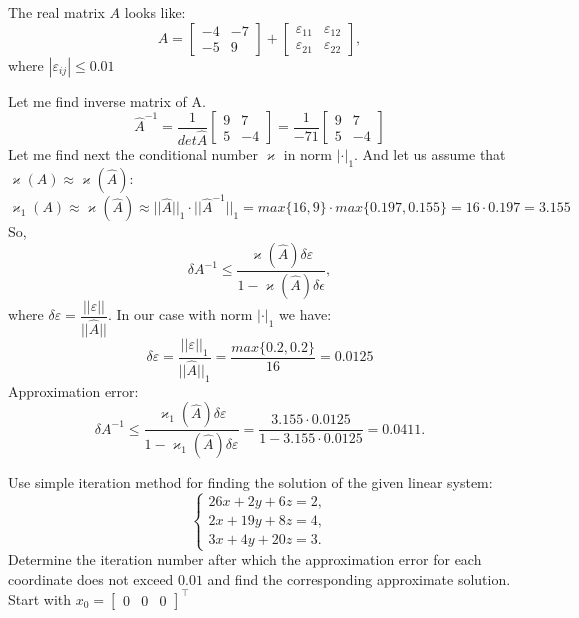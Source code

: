\documentclass[12pt]{report}
\begin{document}
\begin{solution}
    The real matrix $A$ looks like:
    \[A = \begin{bmatrix}-4 & -7\\-5 & 9\end{bmatrix}+\begin{bmatrix}\varepsilon_{11} & \varepsilon_{12}\\\varepsilon_{21} & \varepsilon_{22}\end{bmatrix},\]
   where $|\varepsilon_{ij}|\leq 0.01$

   Let me find  inverse matrix of A.
   \[
      \hat{A}^{-1} = \dfrac{1}{det \hat A}\begin{bmatrix} 9 & 7\\5 & -4\end{bmatrix}=\dfrac{1}{-71}\begin{bmatrix} 9 & 7\\5 & -4\end{bmatrix}
   \]
   Let me find next the conditional number $\varkappa$ in norm $|\cdot|_1$.  
   And let us assume that $\varkappa (A) \approx \varkappa(\hat A)$:
   \[\varkappa_1(A) \approx \varkappa(\hat{A}) \approx ||\hat{A}||_1\cdot||\hat A^{-1}||_1=max\{16,9\}\cdot max\{0.197, 0.155\} = 16 \cdot 0.197 = 3.155\]
   So,
   \[ \delta A^{-1} \leq \dfrac{\varkappa(\hat A) \delta \varepsilon}{1-\varkappa (\hat A)\delta \epsilon},
   \]
   where $\delta \varepsilon = \dfrac {||\varepsilon||}{||\hat A||}$.
   In our case with norm $|\cdot|_1$ we have:  
   \[
      \delta \varepsilon = \dfrac {||\varepsilon||_1}{||\hat A||_1}=\dfrac {max\{0.2,0.2\}}{16}=0.0125
   \]
   Approximation error:
   \[ \delta A^{-1} \leq \dfrac{\varkappa_1(\hat A) \delta \varepsilon}{1-\varkappa_1 (\hat A)\delta \varepsilon}=\dfrac{3.155\cdot 0.0125}{1-3.155\cdot 0.0125}=0.0411.
   \]
\end{solution}

\begin{problem}{}
    Use simple iteration method for finding the solution of the given linear system:
    \[
         \left\{
            \begin{array}{c}
               26x + 2y + 6z = 2,\\
               2x + 19y + 8z = 4, \\
               3x + 4y + 20z = 3.
            \end{array}
          \right.
    \]
    Determine the iteration number after which the approximation error for each coordinate does not exceed $0.01$ and find the corresponding approximate solution. Start with $x_0 = \begin{bmatrix}
      0 & 0 & 0
    \end{bmatrix}^\intercal$
\end{problem}
\end{document}
